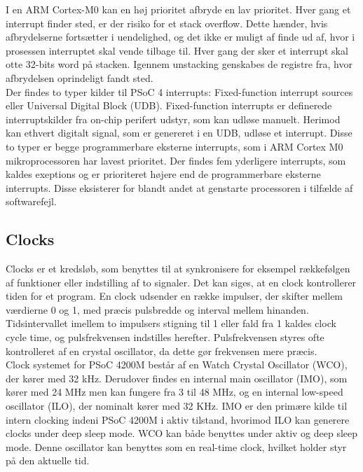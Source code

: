 I en ARM Cortex-M0 kan en høj prioritet afbryde en lav prioritet. Hver gang et interrupt finder sted, er der risiko for et stack overflow. Dette hænder, hvis afbrydelserne fortsætter i uendelighed, og det ikke er muligt af finde ud af, hvor i prosessen interruptet skal vende tilbage til. Hver gang der sker et interrupt skal otte 32-bits word på stacken. Igennem unstacking genskabes de registre fra, hvor afbrydelsen oprindeligt fandt sted.\\
Der findes to typer kilder til PSoC 4 interrupts: Fixed-function interrupt sources eller Universal Digital Block (UDB). Fixed-function interrupts er definerede interruptskilder fra on-chip perifert udstyr, som kan udløse manuelt. Herimod kan ethvert digitalt signal, som er genereret i en UDB, udløse et interrupt. Disse to typer er begge programmerbare eksterne interrupts, som i ARM Cortex M0 mikroprocessoren har lavest prioritet. Der findes fem yderligere interrupts, som kaldes exeptions og er prioriteret højere end de programmerbare eksterne interrupts. Disse eksisterer for blandt andet at genstarte processoren i tilfælde af softwarefejl. \citep{Badiger2016}\\

\subsection{Clocks}
Clocks er et kredsløb, som benyttes til at synkronisere for eksempel rækkefølgen af funktioner eller indstilling af to signaler. Det kan siges, at en clock kontrollerer tiden for et program. En clock udsender en række impulser, der skifter mellem værdierne 0 og 1, med præcis pulsbredde og interval mellem hinanden. Tidsintervallet imellem to impulsers stigning til 1 eller fald fra 1 kaldes clock cycle time, og pulsfrekvensen indstilles herefter. Pulsfrekvensen styres ofte kontrolleret af en crystal oscillator, da dette gør frekvensen mere præcis. \citep{Tanenbaum2006}\\
Clock systemet for PSoC 4200M består af en Watch Crystal Oscillator (WCO), der kører med 32 kHz. Derudover findes en internal main oscillator (IMO), som kører med 24 MHz men kan fungere fra 3 til 48 MHz, og en internal low-speed oscillator (ILO), der nominalt kører med 32 KHz. IMO er den primære kilde til intern clocking indeni PSoC 4200M i aktiv tilstand, hvorimod ILO kan generere clocks under deep sleep mode. WCO kan både benyttes under aktiv og deep sleep mode. Denne oscillator kan benyttes som en real-time clock, hvilket holder styr på den aktuelle tid.



%
%
%
